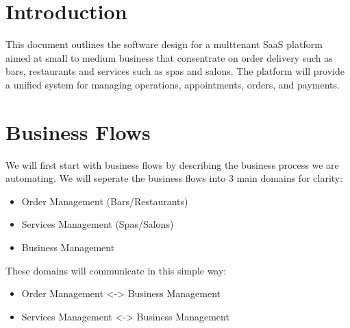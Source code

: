 \documentclass[]{VUMIFTemplateClass}
\begin{document}



\section{Introduction}
This document outlines the software design for a multtenant SaaS platform
aimed at small to medium business that consentrate on order delivery such as
bars, restaurants and services such as spas and salons. The platform will
provide a unified system for managing operations, appointments, orders, and
payments.








\section{Business Flows}

We will first start with business flows by describing the business process we are automating. We will
seperate the business flows into 3 main domains for clarity:
\begin{itemize}
    \item Order Management (Bars/Restaurants)
    \item Services Management (Spas/Salons)
    \item Business Management
\end{itemize}
These domains will communicate in this simple way:
\begin{itemize}
    \item Order Management <-> Business Management
    \item Services Management <-> Business Management
\end{itemize}
\end{document}

